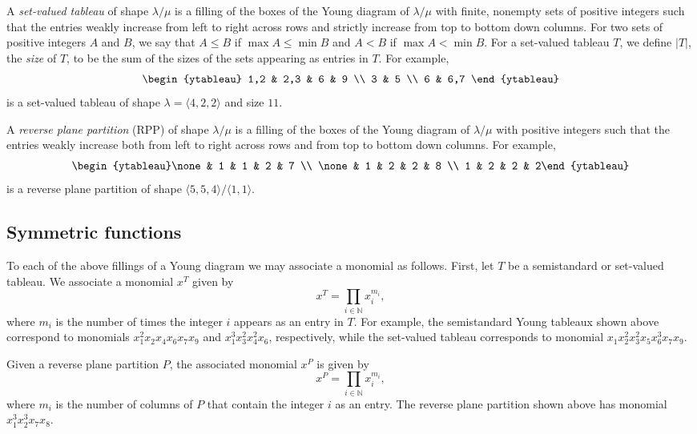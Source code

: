 \documentclass[12pt]{amsart}
\theoremstyle{definition}
\begin{document}
A \textit{set-valued tableau} of shape $\lambda / \mu$ is a filling of the boxes of the Young diagram of $\lambda / \mu$ with finite, nonempty sets of positive integers such that the entries weakly increase from left to right across rows and strictly increase from top to bottom down columns.  For two sets of positive integers $A$ and $B$, we say that $A \leq B$ if $\max{A} \leq \min{B}$ and $A < B$ if $\max{A} < \min{B}$. For a set-valued tableau $T$, we define $\vert T \vert$, the \textit{size} of $T$, to be the sum of the sizes of the sets appearing as entries in $T$. For example,
$$\begin{ytableau} 1,2 & 2,3 & 6 & 9 \\ 
3 & 5 \\
6 & 6,7 \end{ytableau}$$
is a set-valued tableau of shape $\lambda = \langle 4,2,2 \rangle $ and size $11$.

A \textit{reverse plane partition} (RPP) of shape $\lambda / \mu$ is a filling of the boxes of the Young diagram of $\lambda / \mu$ with positive integers such that the entries weakly increase both from left to right across rows and from top to bottom down columns. For example,
$$\begin{ytableau}\none & 1 & 1 & 2 & 7 \\ \none & 1 & 2 & 2 & 8 \\ 1 & 2 & 2 & 2\end{ytableau}$$
is a reverse plane partition of shape $\langle 5,5,4\rangle /\langle 1,1 \rangle $.
\subsection{Symmetric functions}
To each of the above fillings of a Young diagram we may associate a monomial as follows. First, let $T$ be a semistandard or set-valued tableau. We associate a monomial $x^T$ given by
$$x^T = \prod_{i \in \mathbb{N}} x_i^{m_i},$$
where $m_i$ is the number of times the integer $i$ appears as an entry in $T$.
For example, the semistandard Young tableaux shown above correspond to monomials $x_1^2x_2x_4x_6x_7x_9$ and $x_1^3x_3^2x_4^2x_6$, respectively, while the set-valued tableau corresponds to monomial $x_1x_2^2x_3^2x_5x_6^3x_7x_9$.

Given a reverse plane partition $P$, the associated monomial $x^P$ is given by
$$x^P = \prod_{i \in \mathbb{N}} x_i^{m_i},$$
where $m_i$ is the number of columns of $P$ that contain the integer $i$ as an entry. The reverse plane partition shown above has monomial $x_1^3x_2^3x_7x_8$.
\end{document}
